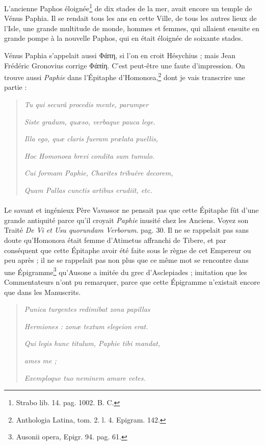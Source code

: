 \documentclass[a4paper, 18pt, oneside]{article}
\begin{document}
L'ancienne Paphos éloignée\footnote{Strabo lib. 14. pag. 1002. B. C.} de dix stades de la mer, avait encore un temple de Vénus Paphia. Il se rendait tous les ans en cette Ville, de tous les autres lieux de l'Isle, une grande multitude de monde, hommes et femmes, qui allaient ensuite en grande pompe à la nouvelle Paphos, qui en était éloignée de soixante stades.

Vénus Paphia s'appelait aussi Φάπη, si l'on en croit Hésychius ; mais Jean Frédéric Gronovius corrige Φάπίη. C'est peut-être une faute d'impression. On trouve aussi \emph{Paphie} dans l'Épitaphe d'Homonœa,\footnote{Anthologia Latina, tom. 2. l. 4. Epigram. 142.} dont je vais transcrire une partie :
\begin{quotation}
\emph{Tu qui securâ procedis mente, parumper}

\hspace*{5mm}\emph{Siste gradum, quæso, verbaque pauca lege.}

\emph{Illa ego, quæ claris fueram prælata puellis,}

\hspace*{5mm}\emph{Hoc Homonoea brevi condita sum tumulo.}

\emph{Cui formam Paphie, Charites tribuêre decorem,}

\hspace*{5mm}\emph{Quam Pallas cunctis artibus erudiit, etc.}
\end{quotation}
\paragraph{}
Le savant et ingénieux Père Vavassor ne pensait pas que cette Épitaphe fût d'une grande antiquité parce qu'il croyait \emph{Paphie} inusité chez les Anciens. Voyez son Traité \emph{De Vi et Usu quorundam Verborum}. pag. 30. Il ne se rappelait pas sans doute qu'Homonœa était femme d'Atimetus affranchi de Tibere, et par conséquent que cette Épitaphe avoir été faite sous le règne de cet Empereur ou peu après ; il ne se rappelait pas non plus que ce même mot se rencontre dans une Épigramme\footnote{Ausonii opera, Epigr. 94. pag. 61.} qu'Ausone a imitée du grec d'Asclepiades ; imitation que les Commentateurs n'ont pu remarquer, parce que cette Épigramme n'existait encore que dans les Manuscrits.
\begin{quotation}
\emph{Punica turgentes redimibat zona papillas}

\hspace*{5mm}\emph{Hermiones : zonæ textum elegeion erat.}

\emph{Qui legis hunc titulum, Paphie tibi mandat,}

\hspace*{15mm}\emph{ames me ;}

\hspace*{5mm}\emph{Exemploque tuo neminem amare vetes.}
\end{quotation}
\end{document}
